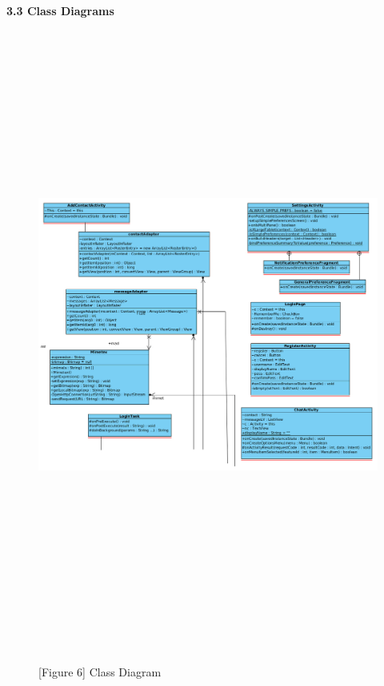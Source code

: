 \documentclass[29pt,a4paper]{moderncv}
\begin{document}
\newpage	
	\noindent \\ \left\textbf{3.3 Class Diagrams}\\
			\begin{figure}
				\centering
				\\ \includegraphics[width=6.7in, height=7.5in]{./classDiagram_part1.jpg}
				\\\caption{[Figure 6] Class Diagram}\\
			\end{figure}
			
\end{document}
